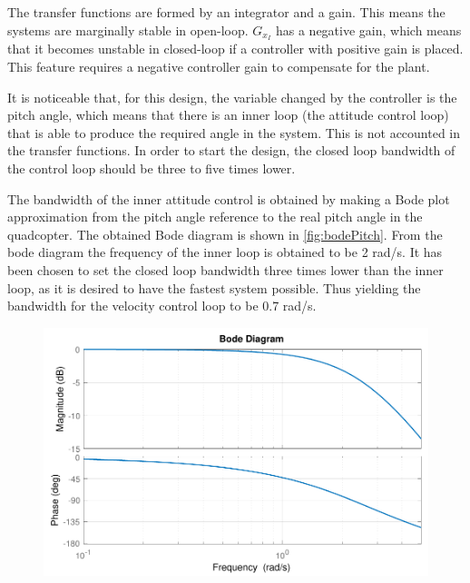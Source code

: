 The transfer functions are formed by an integrator and a gain. This means the systems are marginally stable in open-loop. $G_{x_I}$ has a negative gain, which means that it becomes unstable in closed-loop if a controller with positive gain is placed. This feature requires a negative controller gain to compensate for the plant.

It is noticeable that, for this design, the variable changed by the controller is the pitch angle, which means that there is an inner loop (the attitude control loop) that is able to produce the required angle in the system. This is not accounted in the transfer functions. In order to start the design, the closed loop bandwidth of the control loop should be three to five times lower. 

The bandwidth of the inner attitude control is obtained by making a Bode plot approximation from the pitch angle reference to the real pitch angle in the quadcopter. The obtained Bode diagram is shown in \autoref{fig:bodePitch}. From the bode diagram the frequency of the inner loop is obtained to be 2 rad/s. It has been chosen to set the closed loop bandwidth three times lower than the inner loop, as it is desired to have the fastest system possible. Thus yielding the bandwidth for the velocity control loop to be 0.7 rad/s.
%
\begin{figure}[H]
    \includegraphics[scale=.8]{figures/bodePitch}
    \centering			
    \label{fig:bodePitch}
\end{figure} 
%
